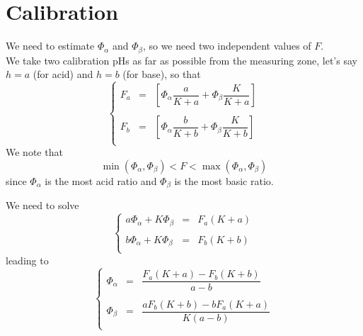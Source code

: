 \documentclass[aps]{revtex4}
\begin{document}
\section{Calibration}
\noindent We need to estimate $\Phi_\alpha$ and $\Phi_\beta$, so we need two independent values of $F$.\\
We take two calibration pHs as far as possible from the measuring zone, let's say $h=a$ (for acid) and $h=b$ (for base), so that
\begin{equation}
\left\lbrace
\displaystyle
\begin{array}{rcl}
	F_a & = &  \left[  \Phi_\alpha \dfrac{a}{K+a} + \Phi_\beta \dfrac{K}{K+a}\right]\\
	\\
	F_b & = & \left[  \Phi_\alpha \dfrac{b}{K+b} + \Phi_\beta \dfrac{K}{K+b}\right]\\
\end{array}
\right.
\end{equation}
We note that 
\begin{equation}
	\min\left(\Phi_\alpha,\Phi_\beta\right) < F  < \max\left(\Phi_\alpha,\Phi_\beta\right)
\end{equation}
since $\Phi_\alpha$ is the most acid ratio and $\Phi_\beta$ is the most basic ratio.

We need to solve
\begin{equation}
\left\lbrace
\displaystyle
	\begin{array}{rcl}
	a \Phi_\alpha + K \Phi_\beta & = & F_a(K+a)\\
	\\
	b \Phi_\alpha + K \Phi_\beta & = & F_b(K+b)\\
	\end{array}
\right.
\end{equation}
leading to
\begin{equation}
\left\lbrace
\displaystyle
	\begin{array}{rcl}
	\Phi_\alpha & = & \dfrac{F_a(K+a)-F_b(K+b)}{a-b}\\
	\\
	\Phi_\beta & = & \dfrac{aF_b(K+b)-bF_a(K+a)}{K(a-b)}\\
	\end{array}
\right.
\end{equation}
\end{document}
